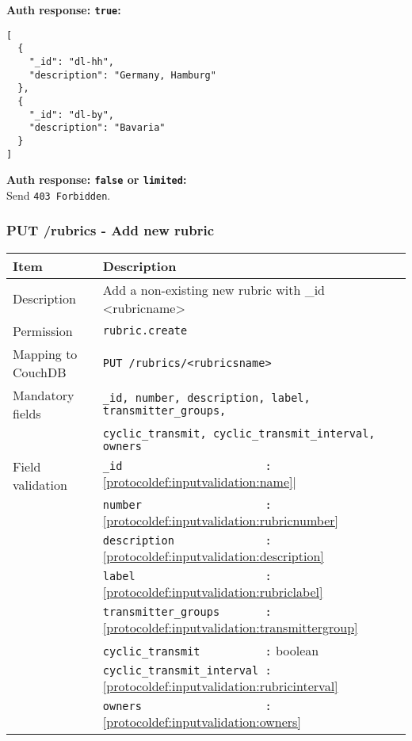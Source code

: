 \textbf{Auth response: \texttt{true}:}
\begin{lstlisting}
[
  {
    "_id": "dl-hh",
    "description": "Germany, Hamburg"
  },
  {
    "_id": "dl-by",
    "description": "Bavaria"
  }
]  
\end{lstlisting}

\textbf{Auth response: \texttt{false} or \texttt{limited}:}\\
Send \verb|403 Forbidden|.


\subsubsection{PUT /rubrics - Add new rubric}
\label{protocoldef:microservicesapi:database:putrubrics/rubrics_create}
\begin{table}[htbp]
  \begin{tabular}{|l|p{12cm}|} \hline
    Item               & Description  \\ \hline \hline
    Description        & Add a non-existing new rubric with \_id <rubricname>\\ \hline
    Permission         & \verb|rubric.create| \\ \hline
    Mapping to CouchDB & \verb|PUT /rubrics/<rubricsname>|\\ \hline
    Mandatory fields   & \verb|_id, number, description, label, transmitter_groups,| \\
                       & \verb|cyclic_transmit, cyclic_transmit_interval, owners| \\ \hline
    Field validation   & \verb|_id                      :| \ref{protocoldef:inputvalidation:name}| \\
                       & \verb|number                   :| \ref{protocoldef:inputvalidation:rubricnumber} \\
                       & \verb|description              :| \ref{protocoldef:inputvalidation:description} \\
                       & \verb|label                    :| \ref{protocoldef:inputvalidation:rubriclabel} \\
                       & \verb|transmitter_groups       :| \ref{protocoldef:inputvalidation:transmittergroup} \\
                       & \verb|cyclic_transmit          :| boolean \\
                       & \verb|cyclic_transmit_interval :| \ref{protocoldef:inputvalidation:rubricinterval} \\
                       & \verb|owners                   :| \ref{protocoldef:inputvalidation:owners} \\ \hline
  \end{tabular}
\end{table}

